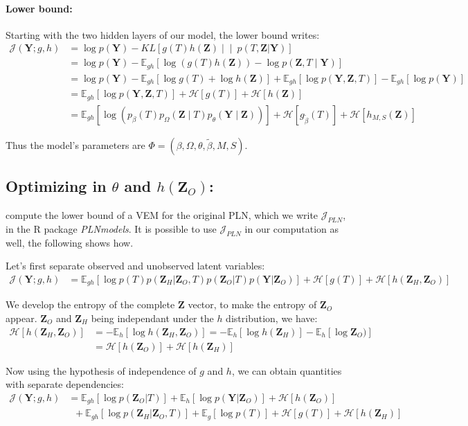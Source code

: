 \documentclass[11pt,a4paper]{article}
\newcommand{\entr}{\mathcal{H}}
\newcommand{\Ybf}{\boldsymbol{Y}}
\newcommand{\Zbf}{\boldsymbol{Z}}
\newcommand{\Esp}{\mathds{E}}
\begin{document}
\paragraph{Lower bound:}
Starting with the two hidden layers of our model, the lower bound writes:
\begin{align*}
\mathcal{J}(\Ybf; g,h)&=\log p(\Ybf) - KL\left[g(T) h(\Zbf) \middle\vert\middle\vert\ p(T,\Zbf | \Ybf)\right]\\
&= \log p(\Ybf) - \Esp_{gh}[\log( g(T) h(\Zbf)) - \log p(\Zbf,T\mid \Ybf) ]\\
&= \log p(\Ybf) - \Esp_{gh}[\log g(T) + \log h(\Zbf) ] + \Esp_{gh}[\log p(\Ybf,\Zbf,T)] - \Esp_{gh}[\log p(\Ybf)]\\
&= \Esp_{gh} [\log p(\Ybf,\Zbf,T)] + \entr[g(T)] + \entr[h(\Zbf)]\\
&= \Esp_{gh} [\log (p_\beta(T)p_{\Omega}(\Zbf\mid T)p_\theta(\Ybf\mid \Zbf))] + \entr[g_{\widetilde{\beta}}(T)] + \entr[h_{M,S}(\Zbf)]
\end{align*}

Thus the model's parameters are $\Phi = (\beta, \Omega, \theta, \widetilde{\beta},M,S)$.
\subsection{Optimizing in $\theta$ and $h(\Zbf_O)$:}
\citet{CMR18} compute the lower bound of a VEM for the original PLN, which we write $\mathcal{J}_{PLN}$,  in the R package \textit{PLNmodels}. It is possible to use $\mathcal{J}_{PLN}$ in our computation as well, the following shows how.

Let's first separate observed and unobserved latent variables:
\begin{align*}
\mathcal{J}(\Ybf; g,h)&= \Esp_{gh}[\log p(T)  p(\Zbf_H| \Zbf_O,T) p(\Zbf_O|T)p(\Ybf|\Zbf_O)] + \entr[g(T)] +\entr[h(\Zbf_H,\Zbf_O)]
\end{align*}

 We develop the entropy of the complete $\Zbf$ vector, to make the entropy of $\Zbf_O$ appear. $\Zbf_O$ and $\Zbf_H$ being independant under the $h$ distribution, we have:
\begin{align*}
\entr[h(\Zbf_H,\Zbf_O)] &= -\Esp_h[\log h(\Zbf_H,\Zbf_O)] =-\Esp_h[\log h(\Zbf_H)] - \Esp_h[\log \Zbf_O)]\\
&=\entr[h(\Zbf_O)] +\entr[h(\Zbf_H)]
\end{align*}

Now using the hypothesis of independence of $g$ and $h$, we can obtain quantities with separate dependencies:
\begin{align}
\mathcal{J}(\Ybf; g,h)&=  \Esp_{gh}[\log p(\Zbf_O | T)] +\Esp_h[\log p(\Ybf|\Zbf_O)]+\entr[h(\Zbf_O)]  \label{PLNlike}\\
& \;\; + \Esp_{gh}[\log p(\Zbf_H | \Zbf_O,T) ]+\Esp_g[\log p(T)] +\entr[g(T)]+\entr[h(\Zbf_H)] \label{new}
\end{align}
\end{document}
